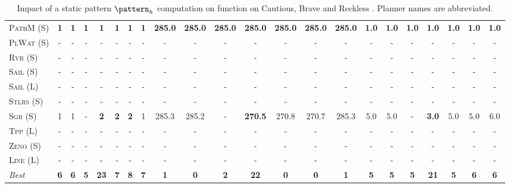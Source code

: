 \begin{table}[tb]
{\begin{tabular}{|l||ccccccc||ccccccc||ccccccc||}
\textsc{PathM} (S)&\textbf{1}&\textbf{1}&\textbf{1}&\textbf{1}&\textbf{1}&\textbf{1}&\textbf{1}&\textbf{285.0}&\textbf{285.0}&\textbf{285.0}&\textbf{285.0}&\textbf{285.0}&\textbf{285.0}&\textbf{285.0}&\textbf{1.0}&\textbf{1.0}&\textbf{1.0}&\textbf{1.0}&\textbf{1.0}&\textbf{1.0}&\textbf{1.0}\\
\textsc{PlWat} (S)&-&-&-&-&-&-&-&-&-&-&-&-&-&-&-&-&-&-&-&-&-\\
\textsc{Rvr} (S)&-&-&-&-&-&-&-&-&-&-&-&-&-&-&-&-&-&-&-&-&-\\
\textsc{Sail} (S)&-&-&-&-&-&-&-&-&-&-&-&-&-&-&-&-&-&-&-&-&-\\
\textsc{Sail} (L)&-&-&-&-&-&-&-&-&-&-&-&-&-&-&-&-&-&-&-&-&-\\
\textsc{Stlrs} (S)&-&-&-&-&-&-&-&-&-&-&-&-&-&-&-&-&-&-&-&-&-\\
\textsc{Sgr} (S)&1&1&-&\textbf{2}&\textbf{2}&\textbf{2}&1&285.3&285.2&-&\textbf{270.5}&270.8&270.7&285.3&5.0&5.0&-&\textbf{3.0}&5.0&5.0&6.0\\
\textsc{Tpp} (L)&-&-&-&-&-&-&-&-&-&-&-&-&-&-&-&-&-&-&-&-&-\\
\textsc{Zeno} (S)&-&-&-&-&-&-&-&-&-&-&-&-&-&-&-&-&-&-&-&-&-\\
\textsc{Line} (L)&-&-&-&-&-&-&-&-&-&-&-&-&-&-&-&-&-&-&-&-&-
\\\hline
\textit{Best}&\textbf{6}&\textbf{6}&\textbf{5}&\textbf{23}&\textbf{7}&\textbf{8}&\textbf{7}&\textbf{1}&\textbf{0}&\textbf{2}&\textbf{22}&\textbf{0}&\textbf{0}&\textbf{1}&\textbf{5}&\textbf{5}&\textbf{5}&\textbf{21}&\textbf{5}&\textbf{6}&\textbf{6}\\\hline

        \end{tabular}}
        \caption{Impact of a static pattern $\pattern_h$ computation on function on Cautious, Brave and Reckless \pattyd. Planner names are abbreviated.}
        \label{tab:abl-patternh-static}
        \end{table}
        